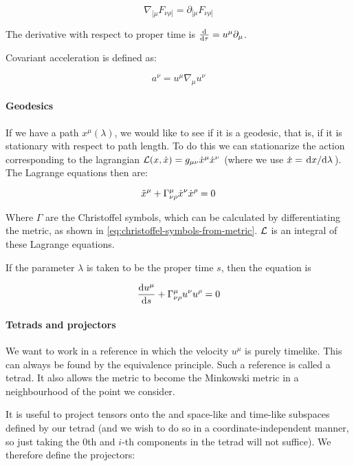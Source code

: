 \begin{equation}
    \nabla_{[\mu} F_{\nu\rho]} = \partial_{[\mu} F_{\nu\rho]}
\end{equation}

The derivative with respect to proper time is $\dv{}{\tau} = u^\mu \partial_\mu$.

Covariant acceleration is defined as:

\begin{equation}
    a^\nu = u^\mu \nabla_\mu u^\nu
\end{equation}

\paragraph{Geodesics}

If we have a path $x^\mu(\lambda)$, we would like to see if it is a geodesic, that is, if it is stationary with respect to path length. To do this we can stationarize the action corresponding to the lagrangian $\mathcal{L} (x, \Dot{x}) = g_{\mu\nu} \Dot{x}^\mu \Dot{x}^\nu$ (where we use $\Dot{x} = \dv*{x}{\lambda}$). The Lagrange equations then are:

\begin{equation}
    \Ddot{x}^\mu + \Gamma^\mu_{\nu\rho} \Dot{x}^\nu \Dot{x}^\rho = 0
\end{equation}

Where $\Gamma$ are the Christoffel symbols, which can be calculated by differentiating the metric, as shown in \eqref{eq:christoffel-symbols-from-metric}. $\mathcal{L}$ is an integral of these Lagrange equations.

If the parameter $\lambda$ is taken to be the proper time $s$, then the equation is

\begin{equation}
    \dv{u^\mu}{s} + \Gamma^\mu _{\nu\rho} u^\nu u^\rho = 0
\end{equation}

\paragraph{Tetrads and projectors}

We want to work in a reference in which the velocity $u^\mu$ is purely timelike. This can always be found by the equivalence principle. Such a reference is called a tetrad. It also allows the metric to become the Minkowski metric in a neighbourhood of the point we consider.

It is useful to project tensors onto the and space-like and time-like subspaces defined by our tetrad (and we wish to do so in a coordinate-independent manner,  so just taking the 0th and $i $-th components in the tetrad will not suffice). We therefore define the projectors:

